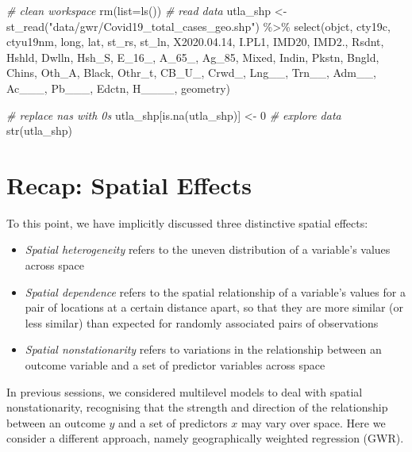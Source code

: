 \documentclass[
]{book}
\newenvironment{Shaded}{\begin{snugshade}}{\end{snugshade}}
\newcommand{\AttributeTok}[1]{\textcolor[rgb]{0.77,0.63,0.00}{#1}}
\newcommand{\CommentTok}[1]{\textcolor[rgb]{0.56,0.35,0.01}{\textit{#1}}}
\newcommand{\DecValTok}[1]{\textcolor[rgb]{0.00,0.00,0.81}{#1}}
\newcommand{\FloatTok}[1]{\textcolor[rgb]{0.00,0.00,0.81}{#1}}
\newcommand{\FunctionTok}[1]{\textcolor[rgb]{0.00,0.00,0.00}{#1}}
\newcommand{\NormalTok}[1]{#1}
\newcommand{\OtherTok}[1]{\textcolor[rgb]{0.56,0.35,0.01}{#1}}
\newcommand{\SpecialCharTok}[1]{\textcolor[rgb]{0.00,0.00,0.00}{#1}}
\newcommand{\StringTok}[1]{\textcolor[rgb]{0.31,0.60,0.02}{#1}}
\begin{document}
\begin{Shaded}
\begin{Highlighting}[]
\CommentTok{\# clean workspace}
\FunctionTok{rm}\NormalTok{(}\AttributeTok{list=}\FunctionTok{ls}\NormalTok{())}
\CommentTok{\# read data}
\NormalTok{utla\_shp }\OtherTok{\textless{}{-}} \FunctionTok{st\_read}\NormalTok{(}\StringTok{"data/gwr/Covid19\_total\_cases\_geo.shp"}\NormalTok{) }\SpecialCharTok{\%\textgreater{}\%}
  \FunctionTok{select}\NormalTok{(objct, cty19c, ctyu19nm, long, lat, st\_rs, st\_ln, X2020.}\FloatTok{04.14}\NormalTok{, I.PL1, IMD20, IMD2., Rsdnt, Hshld, Dwlln, Hsh\_S, E\_16\_, A\_65\_, Ag\_85, Mixed, Indin, Pkstn, Bngld, Chins, Oth\_A, Black, Othr\_t, CB\_U\_, Crwd\_, Lng\_\_, Trn\_\_, Adm\_\_, Ac\_\_\_, Pb\_\_\_, Edctn, H\_\_\_\_, geometry)}

\CommentTok{\# replace nas with 0s}
\NormalTok{utla\_shp[}\FunctionTok{is.na}\NormalTok{(utla\_shp)] }\OtherTok{\textless{}{-}} \DecValTok{0}
\CommentTok{\# explore data}
\FunctionTok{str}\NormalTok{(utla\_shp)}
\end{Highlighting}
\end{Shaded}

\hypertarget{recap-spatial-effects}{%
\section{Recap: Spatial Effects}\label{recap-spatial-effects}}

To this point, we have implicitly discussed three distinctive spatial effects:

\begin{itemize}
\item
  \emph{Spatial heterogeneity} refers to the uneven distribution of a variable's values across space
\item
  \emph{Spatial dependence} refers to the spatial relationship of a variable's values for a pair of locations at a certain distance apart, so that they are more similar (or less similar) than expected for randomly associated pairs of observations
\item
  \emph{Spatial nonstationarity} refers to variations in the relationship between an outcome variable and a set of predictor variables across space
\end{itemize}

In previous sessions, we considered multilevel models to deal with spatial nonstationarity, recognising that the strength and direction of the relationship between an outcome \(y\) and a set of predictors \(x\) may vary over space. Here we consider a different approach, namely geographically weighted regression (GWR).
\end{document}
